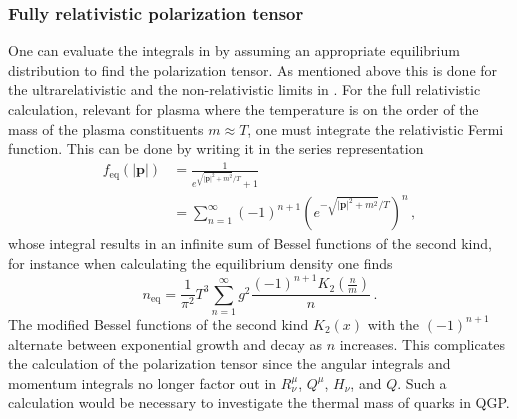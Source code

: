 \subsubsection{Fully relativistic polarization tensor}
One can evaluate the integrals in  by assuming an appropriate equilibrium distribution to find the polarization tensor. As mentioned above this is done for the ultrarelativistic and the non-relativistic limits in \cite{Formanek:2021blc}. For the full relativistic calculation, relevant for plasma where the temperature is on the order of the mass of the plasma constituents $m\approx T$, one must integrate the relativistic Fermi function. This can be done by writing it in the series representation \cite{Letessier:2002ony}
\begin{equation}
\begin{split}
     f_\mathrm{eq}(|\pmb{p}|) &= \frac{1}{e^{\sqrt{|\boldsymbol{p}|^2+ m^2}/T} + 1} \\
     &= \sum_{n=1}^{\infty} (-1)^{n+1}\left( e^{-\sqrt{|\boldsymbol{p}|^2+ m^2}/T}\right)^n\,,
    \end{split}
\end{equation}
whose integral results in an infinite sum of Bessel functions of the second kind, for instance when calculating the equilibrium density one finds
\begin{equation}
    n_\mathrm{eq}=\frac{1}{\pi^2}T^3\sum_{n=1}^{\infty}g^2\frac{ (-1)^{n+1} K_2\left(\frac{n}{m}\right)}{ n}\,.
\end{equation}
The modified Bessel functions of the second kind $K_2(x)$ with the $(-1)^{n+1}$ alternate between exponential growth and decay as $n$ increases. This complicates the calculation of the polarization tensor since the angular integrals and momentum integrals no longer factor out in $R^\mu_\nu$, $Q^\mu$, $H_\nu$, and $Q$. Such a calculation would be necessary to investigate the thermal mass of quarks in QGP.

